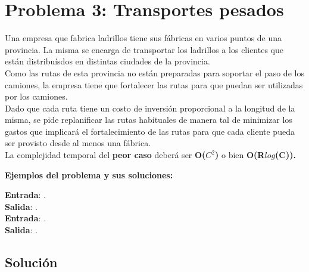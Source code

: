 \documentclass[a4paper, 10pt, twoside]{article}
\begin{document}
\newpage

\section{Problema 3: Transportes pesados}

Una empresa que fabrica ladrillos tiene sus fábricas en varios puntos de una provincia. La misma se encarga de transportar los ladrillos a los clientes que están distribuísdos en distintas ciudades de la provincia.\\
Como las rutas de esta provincia no están preparadas para soportar el paso de los camiones, la empresa tiene que fortalecer las rutas para que puedan ser utilizadas por los camiones.\\
Dado que cada ruta tiene un costo de inversión proporcional a la longitud de la misma, se pide replanificar las rutas habituales de manera tal de minimizar los gastos que implicará el fortalecimiento de las rutas para que cada cliente pueda ser provisto desde al menos una fábrica.\\
La complejidad temporal del \textbf{peor caso} deberá ser \textbf{O($C^2$)} o bien \textbf{O(R$log$(C)).}

\textbf{Ejemplos del problema y sus soluciones:}

\textbf{Entrada}: . \\
\textbf{Salida}: . \\

\textbf{Entrada}: . \\
\textbf{Salida}: . \\

\subsection{Solución}
\end{document}
